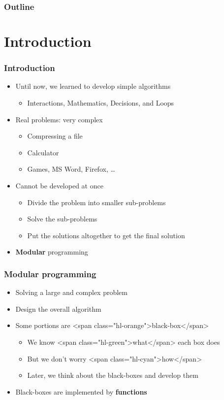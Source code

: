 \documentclass{../c-lecture}
\subtitle{Functions}
\begin{document}
\begin{frame}
  \titlepage{}
\end{frame}
\begin{frame}
  \frametitle{Outline}
  \tableofcontents{}
\end{frame}

\section{Introduction}

\begin{frame}
  \frametitle{Introduction}
  \begin{itemize}
    \item Until now, we learned to develop simple algorithms
    \begin{itemize}
      \item Interactions, Mathematics, Decisions, and Loops
    \end{itemize}
    \item Real problems: very complex
    \begin{itemize}
      \item Compressing a file
      \item Calculator
      \item Games, MS Word, Firefox, \ldots
    \end{itemize}
    \item Cannot be developed at once
    \begin{itemize}
      \item Divide the problem into smaller sub-problems
      \item Solve the sub-problems
      \item Put the solutions altogether to get the final solution
    \end{itemize}
    \item \textbf{\color{Melon} Modular} programming
  \end{itemize}
\end{frame}

\begin{frame}
  \frametitle{Modular programming}
  \begin{itemize}
    \item Solving a large and complex problem
    \item Design the overall algorithm
    \item Some portions are <span class="hl-orange">black-box</span>
    \begin{itemize}
      \item We know <span class="hl-green">what</span> each box does
      \item But we don't worry <span class="hl-cyan">how</span>
      \item Later, we think about the black-boxes and develop them
    \end{itemize}
    \item
      Black-boxes are implemented by \textbf{\color{RubineRed} functions}
  \end{itemize}
\end{frame}
\end{document}
